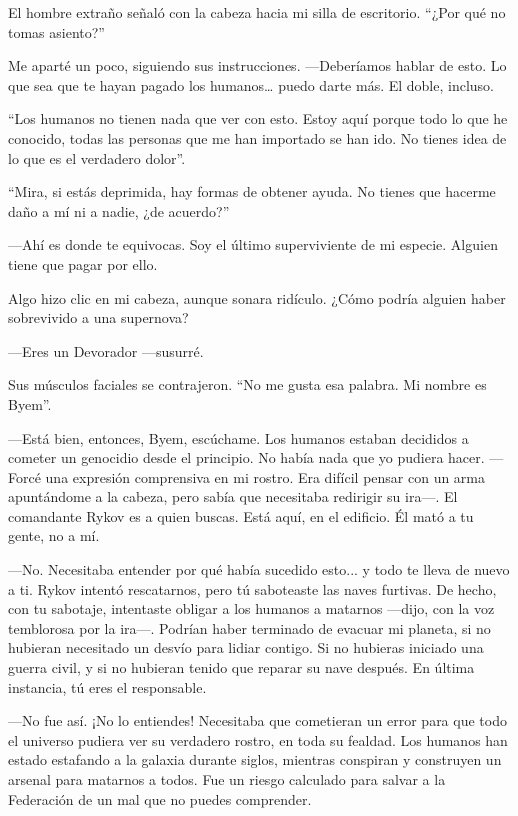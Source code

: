 El hombre extraño señaló con la cabeza hacia mi silla de escritorio. ``¿Por qué no tomas asiento?''


Me aparté un poco, siguiendo sus instrucciones. —Deberíamos hablar de esto. Lo que sea que te hayan pagado los humanos… puedo darte más. El doble, incluso.

``Los humanos no tienen nada que ver con esto. Estoy aquí porque todo lo que he conocido, todas las personas que me han importado se han ido. No tienes idea de lo que es el verdadero dolor''.

``Mira, si estás deprimida, hay formas de obtener ayuda. No tienes que hacerme daño a mí ni a nadie, ¿de acuerdo?''


—Ahí es donde te equivocas. Soy el último superviviente de mi especie. Alguien tiene que pagar por ello.

Algo hizo clic en mi cabeza, aunque sonara ridículo. ¿Cómo podría alguien haber sobrevivido a una supernova?

—Eres un Devorador —susurré.

Sus músculos faciales se contrajeron. ``No me gusta esa palabra. Mi nombre es Byem''.

—Está bien, entonces, Byem, escúchame. Los humanos estaban decididos a cometer un genocidio desde el principio. No había nada que yo pudiera hacer. —Forcé una expresión comprensiva en mi rostro. Era difícil pensar con un arma apuntándome a la cabeza, pero sabía que necesitaba redirigir su ira—. El comandante Rykov es a quien buscas. Está aquí, en el edificio. Él mató a tu gente, no a mí.

—No. Necesitaba entender por qué había sucedido esto... y todo te lleva de nuevo a ti. Rykov intentó rescatarnos, pero tú saboteaste las naves furtivas. De hecho, con tu sabotaje, intentaste obligar a los humanos a matarnos —dijo, con la voz temblorosa por la ira—. Podrían haber terminado de evacuar mi planeta, si no hubieran necesitado un desvío para lidiar contigo. Si no hubieras iniciado una guerra civil, y si no hubieran tenido que reparar su nave después. En última instancia, tú eres el responsable.

—No fue así. ¡No lo entiendes! Necesitaba que cometieran un error para que todo el universo pudiera ver su verdadero rostro, en toda su fealdad. Los humanos han estado estafando a la galaxia durante siglos, mientras conspiran y construyen un arsenal para matarnos a todos. Fue un riesgo calculado para salvar a la Federación de un mal que no puedes comprender.

